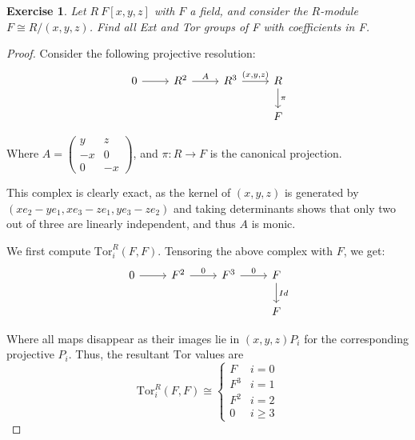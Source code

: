 \documentclass{article}
\newcommand{\Tor}{\text{Tor}}
\newtheorem{exercise}{Exercise}
\begin{document}
\begin{exercise}
  Let $R \ F[x,y,z]$ with $F$ a field, and consider the $R$-module $F \cong R/(x,y,z)$. Find all Ext and Tor groups of F with coefficients in F.
\end{exercise}
\begin{proof}
  Consider the following projective resolution:
  \[
    \begin{tikzcd}
0 \arrow[r] & R^2 \arrow[r, "A"] & R^3 \arrow[r, "{(x, y, z)}"] & R \arrow[d, "\pi "] \\
            &                                                                         &                              & F                  
          \end{tikzcd}
\]

Where $ A = \begin{pmatrix} y  & z \\ - x & 0 \\ 0 & -x \end{pmatrix}$, and $\pi: R \to F$ is the canonical projection. \\

\vspace{0.1in}

This complex is clearly exact, as the kernel of $(x,y,z)$ is generated by $(xe_{2} - ye_{1}, xe_{3} - ze_{1}, ye_{3} - ze_{2})$ and taking determinants shows that only two out of three are linearly independent, and thus $A$ is monic.

We first compute $\Tor_{i}^{R}(F,F)$. Tensoring the above complex with $F$, we get:
\[
  \begin{tikzcd}
0 \arrow[r] & F^2 \arrow[r, "0"] & F^3 \arrow[r, "0"] & F \arrow[d, "Id"] \\
            &                    &                    & F                
\end{tikzcd}
\]

Where all maps disappear as their images lie in $(x,y,z)P_{i}$ for the corresponding projective $P_{i}$. Thus, the resultant $\Tor$ values are
\[
  \Tor_{i}^{R}(F,F) \cong
  \begin{cases}
    F & i = 0\\
    F^{3} & i = 1 \\
    F^{2} & i = 2 \\
    0 & i \geq 3 
  \end{cases}
\]


\end{proof}
\end{document}
